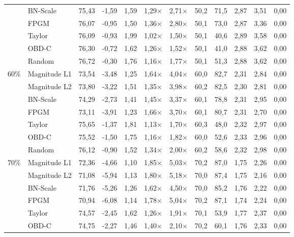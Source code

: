 \begin{table}[H]
{{\begin{tabular}{c l rr rrr rr rrr}
     & BN-Scale & 75,43 & -1,59 & 1,59 & 1,29$\times$ & 2,71$\times$ & 50,2 & 71,5 & 2,87 & 3,51 & 0,00 \\
     & FPGM & 76,07 & -0,95 & 1,50 & 1,36$\times$ & 2,80$\times$ & 50,1 & 73,0 & 2,87 & 3,36 & 0,00 \\
     & Taylor & 76,09 & -0,93 & 1,99 & 1,02$\times$ & 1,50$\times$ & 50,1 & 40,6 & 2,89 & 3,58 & 0,00 \\
     & OBD-C & 76,30 & -0,72 & 1,62 & 1,26$\times$ & 1,52$\times$ & 50,1 & 41,0 & 2,88 & 3,62 & 0,00 \\
     & Random & 76,72 & -0,30 & 1,76 & 1,16$\times$ & 1,77$\times$ & 50,1 & 51,3 & 2,88 & 3,62 & 0,00 \\
    \midrule
    \multirow{7}{*}{60\%} & Magnitude L1 & 73,54 & -3,48 & 1,25 & 1,64$\times$ & 4,04$\times$ & 60,0 & 82,7 & 2,31 & 2,84 & 0,00 \\
     & Magnitude L2 & 73,80 & -3,22 & 1,51 & 1,35$\times$ & 3,98$\times$ & 60,2 & 82,5 & 2,30 & 2,81 & 0,00 \\
     & BN-Scale & 74,29 & -2,73 & 1,41 & 1,45$\times$ & 3,37$\times$ & 60,1 & 78,8 & 2,31 & 2,95 & 0,00 \\
     & FPGM & 73,11 & -3,91 & 1,23 & 1,66$\times$ & 3,70$\times$ & 60,1 & 80,7 & 2,31 & 2,70 & 0,00 \\
     & Taylor & 75,65 & -1,37 & 1,81 & 1,13$\times$ & 1,70$\times$ & 60,3 & 48,0 & 2,32 & 2,97 & 0,00 \\
     & OBD-C & 75,52 & -1,50 & 1,75 & 1,16$\times$ & 1,82$\times$ & 60,0 & 52,6 & 2,33 & 2,96 & 0,00 \\
     & Random & 76,12 & -0,90 & 1,52 & 1,34$\times$ & 2,00$\times$ & 60,2 & 58,6 & 2,32 & 2,98 & 0,00 \\
    \midrule
    \multirow{7}{*}{70\%} & Magnitude L1 & 72,36 & -4,66 & 1,10 & 1,85$\times$ & 5,03$\times$ & 70,2 & 87,0 & 1,75 & 2,26 & 0,00 \\
     & Magnitude L2 & 71,08 & -5,94 & 1,13 & 1,80$\times$ & 5,18$\times$ & 70,0 & 87,4 & 1,75 & 2,16 & 0,00 \\
     & BN-Scale & 71,76 & -5,26 & 1,26 & 1,62$\times$ & 4,50$\times$ & 70,0 & 85,2 & 1,76 & 2,22 & 0,00 \\
     & FPGM & 70,94 & -6,08 & 1,14 & 1,78$\times$ & 5,04$\times$ & 70,2 & 87,1 & 1,74 & 2,24 & 0,00 \\
     & Taylor & 74,57 & -2,45 & 1,62 & 1,26$\times$ & 1,91$\times$ & 70,1 & 53,9 & 1,77 & 2,37 & 0,00 \\
     & OBD-C & 74,75 & -2,27 & 1,46 & 1,40$\times$ & 2,10$\times$ & 70,2 & 60,1 & 1,76 & 2,33 & 0,00 \\

\end{tabular}}}
\end{table}
